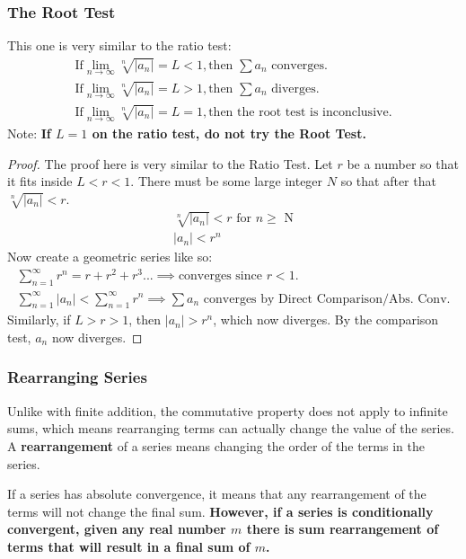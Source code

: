 \documentclass{article}
\begin{document}
\subsubsection{The Root Test}
This one is very similar to the ratio test:
\begin{gather}
    \textrm{If} \lim_{n \to \infty} \sqrt[n]{|a_n|} = L < 1, \textrm{then $\sum a_n$ converges.}\\
    \textrm{If} \lim_{n \to \infty} \sqrt[n]{|a_n|} = L > 1, \textrm{then $\sum a_n$ diverges.}\\
    \textrm{If} \lim_{n \to \infty} \sqrt[n]{|a_n|} = L = 1, \textrm{then the root test is inconclusive.}
\end{gather}
Note: \textbf{If $L=1$ on the ratio test, do not try the Root Test.}
\begin{proof}
The proof here is very similar to the Ratio Test. Let $r$ be a number so that it fits inside $L < r < 1$. There must be some large integer $N$ so that after that $\sqrt[n]{|a_n|} < r$.
\begin{gather*}
    \sqrt[n]{|a_n|} < r\textrm{ for $n \geqslant$ N}\\
    |a_n| < r^n
\end{gather*}
Now create a geometric series like so:
\begin{gather*}
    \sum_{n = 1}^\infty r^n = r + r^2 + r^3... \implies \textrm{converges since $r < 1$.}\\
    \sum_{n = 1}^\infty |a_n| < \sum_{n = 1}^\infty r^n \implies \sum a_n \textrm{ converges by Direct Comparison/Abs. Conv.}
\end{gather*}
Similarly, if $L > r > 1$, then $|a_n| > r^n$, which now diverges. By the comparison test, $a_n$ now diverges.
\end{proof}
\subsubsection{Rearranging Series}
Unlike with finite addition, the commutative property does not apply to infinite sums, which means rearranging terms can actually change the value of the series. A \textbf{rearrangement} of a series means changing the order of the terms in the series.

If a series has absolute convergence, it means that any rearrangement of the terms will not change the final sum. \textbf{However, if a series is conditionally convergent, given any real number $m$ there is sum rearrangement of terms that will result in a final sum of $m$.}
\end{document}
